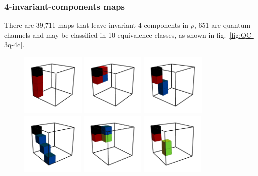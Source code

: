 \documentclass[11pt,dvipsnames]{article} %
\newcommand{\fref}[1]{fig.~\ref{#1}}  \newcommand{\tref}[1]{table~\ref{#1}}
\newcommand{\1}{\mathds{1}}
\begin{document}
\subsubsection*{4-invariant-components maps}
There are 39,711 maps that leave invariant 4 components in $\rho$, 651
are quantum channels and may be classified in 10 equivalence classes, as
shown in \fref{fig:QC-3q-4c}.
\begin{figure}[H]
	\centering
	\hfill \hfill
	\includegraphics[height=3cm]{img/3q-4c-si-1}
	\hfill
	\includegraphics[height=3cm]{img/3q-4c-si-2}
	\hfill
	\includegraphics[height=3cm]{img/3q-4c-si-3}
	\hfill
	\includegraphics[height=3cm]{img/3q-4c-si-4}
	\hfill
	\includegraphics[height=3cm]{img/3q-4c-si-5}
	\hfill
	\vfill
	\hfill
	\includegraphics[height=3cm]{img/3q-4c-no-1}

\end{figure}
\end{document}

